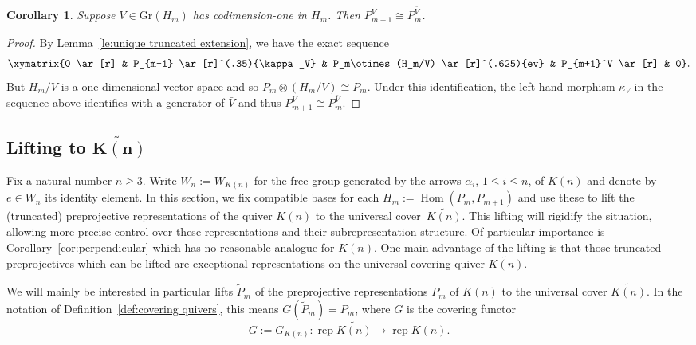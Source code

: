 \documentclass{amsart}
\newtheorem{corollary}[theorem]{Corollary}
\numberwithin{equation}{section}
\newcommand{\Gr}{\mathrm{Gr}}
\newcommand{\Hom}{\operatorname{Hom}}
\newcommand{\rep}{\operatorname{rep}}
\begin{document}
\begin{corollary}
  \label{cor:truncated preprojective isomorphism}
  Suppose $V\in \Gr(H_m)$ has codimension-one in $H_m$.  Then $P_{m+1}^V\cong P_m^{\bar{V}}$.
\end{corollary}
\begin{proof}
  By Lemma~\ref{le:unique truncated extension}, we have the exact sequence
  \[\xymatrix{0 \ar[r] & P_{m-1} \ar[r]^(.35){\kappa_V} & P_m\otimes(H_m/V) \ar[r]^(.625){ev} & P_{m+1}^V \ar[r] & 0}.\]
  But $H_m/V$ is a one-dimensional vector space and so $P_m\otimes(H_m/V)\cong P_m$.
  Under this identification, the left hand morphism $\kappa_V$ in the sequence above identifies with a generator of $\bar{V}$ and thus $P_{m+1}^V\cong P_m^{\bar{V}}$.
\end{proof}

               


\subsection{Lifting to \texorpdfstring{$\mathbf{\widetilde{K(n)}}$}{K(n)}}
\label{Lifting}

Fix a natural number $n\geq 3$.
Write $W_n:=W_{K(n)}$ for the free group generated by the arrows $\alpha_i$, $1\le i\le n$, of $K(n)$ and denote by $e\in W_n$ its identity element.
In this section, we fix compatible bases for each $H_m:=\Hom(P_m,P_{m+1})$ and use these to lift the (truncated) preprojective representations of the quiver $K(n)$ to the universal cover~$\widetilde{K(n)}$.
This lifting will rigidify the situation, allowing more precise control over these representations and their subrepresentation structure.
Of particular importance is Corollary~\ref{cor:perpendicular} which has no reasonable analogue for $K(n)$.
One main advantage of the lifting is that those truncated preprojectives which can be lifted are exceptional representations on the universal covering quiver $\widetilde{K(n)}$.

We will mainly be interested in particular lifts $\tilde P_m$ of the preprojective representations $P_m$ of $K(n)$ to the universal cover $\widetilde{K(n)}$.
In the notation of Definition~\ref{def:covering quivers}, this means $G(\tilde P_m)=P_m$, where $G$ is the covering functor 
\[G:=G_{K(n)}:\rep\widetilde{K(n)}\to\rep K(n).\]
\end{document}
